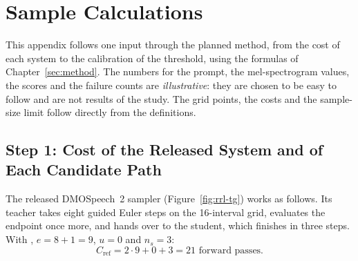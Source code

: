 \clearpage
\setcounter{section}{0}
\renewcommand{\thesection}{\Alph{section}}
\renewcommand{\theHsection}{appendix.\Alph{section}}

\section[APPENDIX A.\ SAMPLE CALCULATIONS]{Sample Calculations}
\label{app:calc}

This appendix follows one input through the planned method, from the cost of each system to the calibration of the threshold, using the formulas of Chapter~\ref{sec:method}. The numbers for the prompt, the mel-spectrogram values, the scores and the failure counts are \emph{illustrative}: they are chosen to be easy to follow and are not results of the study. The grid points, the costs and the sample-size limit follow directly from the definitions.

\subsection{Step 1: Cost of the Released System and of Each Candidate Path}
\label{app:calc-cost}

The released DMOSpeech~2 sampler (Figure~\ref{fig:rrl-tg}) works as follows. Its teacher takes eight guided Euler steps on the 16-interval grid, evaluates the endpoint once more, and hands over to the student, which finishes in three steps. With , $e=8+1=9$, $u=0$ and $n_s=3$:
\[
C_{\text{ref}} = 2\cdot 9 + 0 + 3 = 21 \text{ forward passes.}
\]

